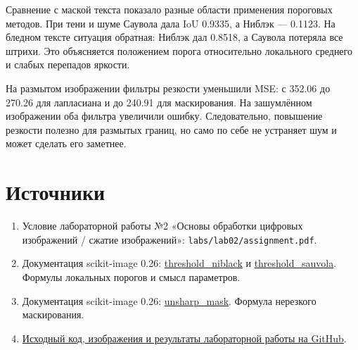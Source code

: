 \documentclass[12pt,a4paper]{extarticle}
\newcommand{\code}[1]{\texttt{\small #1}}
\begin{document}
Сравнение с маской текста показало разные области применения пороговых методов. При тени и шуме Саувола дала IoU 0.9335, а Ниблэк --- 0.1123. На бледном тексте ситуация обратная: Ниблэк дал 0.8518, а Саувола потеряла все штрихи. Это объясняется положением порога относительно локального среднего и слабых перепадов яркости.

На размытом изображении фильтры резкости уменьшили MSE: с 352.06 до 270.26 для лапласиана и до 240.91 для маскирования. На зашумлённом изображении оба фильтра увеличили ошибку. Следовательно, повышение резкости полезно для размытых границ, но само по себе не устраняет шум и может сделать его заметнее.

\section*{Источники}
\begin{enumerate}
\item Условие лабораторной работы №2 «Основы обработки цифровых изображений / сжатие изображений»: \code{labs/lab02/assignment.pdf}.
\item Документация scikit-image 0.26: \href{https://scikit-image.org/docs/0.26.x/api/skimage.filters.html\#skimage.filters.threshold_niblack}{threshold\_niblack} и \href{https://scikit-image.org/docs/0.26.x/api/skimage.filters.html\#skimage.filters.threshold_sauvola}{threshold\_sauvola}. Формулы локальных порогов и смысл параметров.
\item Документация scikit-image 0.26: \href{https://scikit-image.org/docs/0.26.x/api/skimage.filters.html\#skimage.filters.unsharp_mask}{unsharp\_mask}. Формула нерезкого маскирования.
\item \href{https://github.com/YauheniShe/bsu-computer-graphics/tree/main/labs/lab02}{Исходный код, изображения и результаты лабораторной работы на GitHub}.
\end{enumerate}
\end{document}
